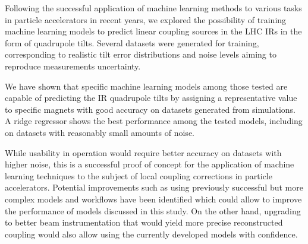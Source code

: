 Following the successful application of machine learning methods to various tasks in particle accelerators in recent years, we explored the possibility of training machine learning models to predict linear coupling sources in the \gls{LHC} \glspl{IR} in the form of quadrupole tilts.
Several datasets were generated for training, corresponding to realistic tilt error distributions and noise levels aiming to reproduce measurements uncertainty.

We have shown that specific machine learning models among those tested are capable of predicting the IR quadrupole tilts by assigning a representative value to specific magnets with good accuracy on datasets generated from simulations.
A ridge regressor shows the best performance among the tested models, including on datasets with reasonably small amounts of noise.

While usability in operation would require better accuracy on datasets with higher noise, this is a successful proof of concept for the application of machine learning techniques to the subject of local coupling corrections in particle accelerators.
Potential improvements such as using previously successful but more complex models and workflows have been identified which could allow to improve the performance of models discussed in this study.
On the other hand, upgrading to better beam instrumentation that would yield more precise reconstructed coupling  would also allow using the currently developed models with confidence.

\glsresetall                                     %
